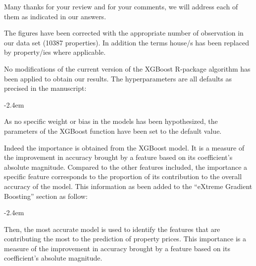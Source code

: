 \documentclass[]{article}
\renewenvironment{quote}{\begin{fquote}\advance\leftmargini -2.4em\begin{oldquote}}{\end{oldquote}\end{fquote}}
\newenvironment{fquote}
  {\def\FrameCommand{
	\fboxsep=0.6em %
	\fcolorbox{black}{white}}%
    \MakeFramed {\advance\hsize-2\width \FrameRestore}
    \begin{minipage}{\linewidth}
  }
  {\end{minipage}\endMakeFramed}
\begin{document}
Many thanks for your review and for your comments, we will address each of them as indicated in our answers.


The figures have been corrected with the appropriate number of observation in our data set (10387 properties). In addition the terms house/s has been replaced by property/ies where applicable.


No modifications of the current version of the XGBoost R-package algorithm has been applied to obtain our results. The hyperparameters are all defaults as precised in the manuscript:

\begin{quote}
As no specific weight or bias in the models has been hypothesized, the parameters of the XGBoost function have been set to the default value.
\end{quote}


Indeed the importance is obtained from the XGBoost model. It is a measure of the improvement in accuracy brought by a feature based on its coefficient's absolute magnitude. Compared to the other features included, the importance a specific feature corresponds to the proportion of its contribution to the overall accuracy of the model. This information as been added to the ``eXtreme Gradient Boosting'' section as follow:

\begin{quote}
Then, the most accurate model is used to identify the features that are contributing the most to the prediction of property prices. This importance is a measure of the improvement in accuracy brought by a feature based on its coefficient's absolute magnitude.
\end{quote}
\end{document}
